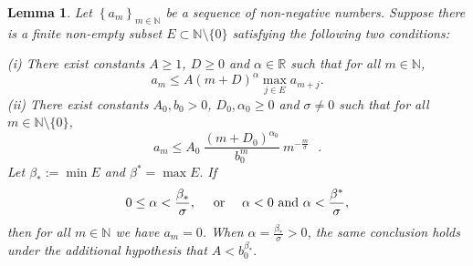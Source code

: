 \documentclass[10pt,a4paper]{amsart}
\newtheorem{lemma}{Lemma}
\begin{document}
\begin{lemma}
	\label{lemmaSeq} Let $\left\{  a_{m}\right\}  _{m\in\mathbb{N}}$ be a sequence
	of non-negative numbers. Suppose there is a finite non-empty subset
	$E\subset\mathbb{N}\setminus\{0\}$ satisfying the following two conditions:
	
	(i) There exist constants $A \ge 1$,   $D \ge 0$ and $\alpha\in\mathbb{R}$ such that for
	all $m\in\mathbb{N}$,
	\[
	a_{m}\leq A\left(  m+D\right)  ^{\alpha}\max_{j\in E}a_{m+j}.
	\]
	(ii) There exist constants $A_{0},b_{0}>0$,  $D_{0},\alpha_{0}\geq0$ and
	$\sigma\neq0$ such that for all $m\in\mathbb{N}\setminus\{0\}$,
	\[
	a_{m}\leq A_{0}\ \frac{\left(  m+D_{0}\right)  ^{\alpha_{0}}}{b_{0}^{m}%
	}\ m^{-\frac{m}{\sigma}}\text{ }.
	\]
	Let $\beta_{\ast}:=\min E$ and $\beta^{\ast}=\max E.$ If
	\[
	0\leq\alpha<\frac{\beta_{\ast}}{\sigma},\text{ \quad or }\quad\alpha<0\text{
		and }\alpha<\frac{\beta^{\ast}}{\sigma},
	\]
	then for all $m\in\mathbb{N}$ we have $a_{m}=0$. When $\alpha
	=\frac{\beta_{\ast}}{\sigma} > 0$, the same conclusion holds under the
	additional hypothesis that $A < b_{0}^{\beta_{\ast}}.$
\end{lemma}
\end{document}
